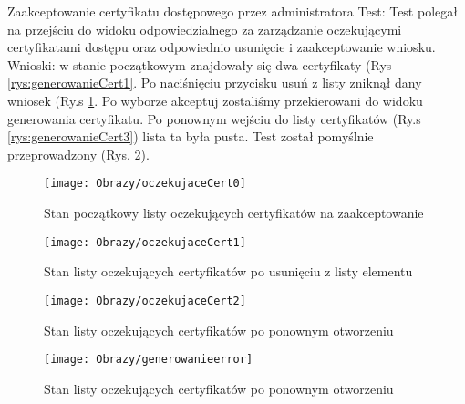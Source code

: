 \begin{enumerate*}
	\item  Zaakceptowanie certyfikatu dostępowego przez administratora \newline
	Test: Test polegał na przejściu do widoku odpowiedzialnego za zarządzanie oczekującymi certyfikatami dostępu oraz odpowiednio usunięcie i zaakceptowanie wniosku.
	\newline Wnioski: w stanie początkowym znajdowały się dwa certyfikaty (Rys \ref{rys:generowanieCert1}. Po naciśnięciu przycisku usuń z listy zniknął dany wniosek (Ry.s \ref{rys:generowanieCert2}. Po wyborze akceptuj zostaliśmy przekierowani do widoku generowania certyfikatu. Po ponownym wejściu do listy certyfikatów (Ry.s \ref{rys:generowanieCert3}) lista ta była pusta. Test został pomyślnie przeprowadzony (Rys. \ref{rys:generowanieCert4}). 
		\begin{figure}[ht!]
			\centering
		\begin{minipage}{0.4\textwidth}
			\texttt{[image: Obrazy/oczekujaceCert0]}
			\caption{Stan początkowy listy oczekujących certyfikatów na zaakceptowanie }
			\label{rys:generowanieCert1}
		\end{minipage}
	\hspace{0.01\textwidth}
		\begin{minipage}{0.4\textwidth}
			\texttt{[image: Obrazy/oczekujaceCert1]}
			\caption{Stan listy oczekujących certyfikatów po usunięciu z listy elementu}
			\label{rys:generowanieCert2}
		\end{minipage}
	\end{figure}

\begin{figure}
	\centering
		\begin{minipage}{0.4\textwidth}
			\texttt{[image: Obrazy/oczekujaceCert2]}
			\caption{Stan listy oczekujących certyfikatów po ponownym otworzeniu}
			\label{rys:generowanieCert3}
		\end{minipage}
	\hspace{0.01\textwidth}
	\begin{minipage}{0.4\textwidth}
		\texttt{[image: Obrazy/generowanieerror]}
		\caption{Stan listy oczekujących certyfikatów po ponownym otworzeniu}
		\label{rys:generowanieCert4}
	\end{minipage}
	\end{figure}
	

\end{enumerate*}
